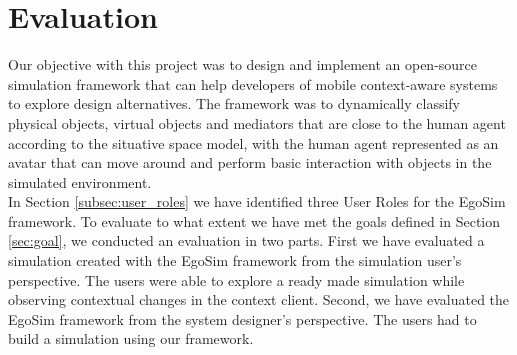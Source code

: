 \chapter{Evaluation}\label{ch:evaluation}
Our objective with this project was to design and implement an open-source simulation framework that can help developers of mobile context-aware systems to explore design alternatives. The framework was to dynamically classify physical objects, virtual objects and mediators that are close to the human agent according to the situative space model, with the human agent represented as an avatar that can move around and perform basic interaction with objects in the simulated environment.\\

In Section \ref{subsec:user_roles} we have identified three User Roles for the EgoSim framework. To evaluate to what extent we have met the goals defined in Section \ref{sec:goal}, we conducted an evaluation in two parts. First we have evaluated a simulation created with the EgoSim framework from the simulation user's perspective. The users were able to explore a ready made simulation while observing contextual changes in the context client. Second, we have evaluated the EgoSim framework from the system designer's perspective. The users had to build a simulation using our framework.\\







